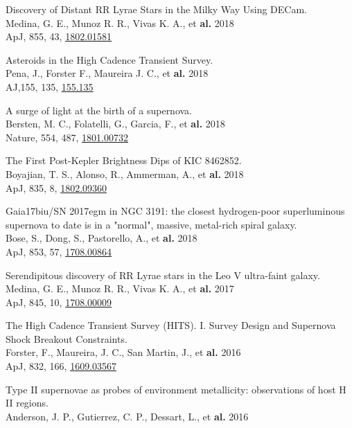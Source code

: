 \documentclass[12pt]{article}
\begin{document}
\begin{bibenum}
    \item 
Discovery of Distant RR Lyrae Stars in the Milky Way Using DECam.\\
Medina, G. E., Munoz R. R., Vivas K. A., et \textbf{al.} 2018\\
ApJ, 855, 43, \href{https://arxiv.org/abs/1802.01581}{1802.01581}
    \item 
Asteroids in the High Cadence Transient Survey.\\
Pena, J., Forster F., Maureira J. C., et \textbf{al.} 2018\\
AJ,155, 135, \href{http://adsabs.harvard.edu/abs/2018AJ....155..135P}{155.135}
    \item 	
A surge of light at the birth of a supernova.\\
Bersten, M. C., Folatelli, G., Garcia, F., et \textbf{al.} 2018\\
Nature, 554, 487, \href{https://arxiv.org/abs/1801.00732}{1801.00732}
    \item 	
The First Post-Kepler Brightness Dips of KIC 8462852.\\
Boyajian, T. S., Alonso, R., Ammerman, A., et \textbf{al.} 2018\\
ApJ, 835, 8, \href{https://arxiv.org/abs/1802.09360}{1802.09360}
    \item 	
Gaia17biu/SN 2017egm in NGC 3191: the closest hydrogen-poor superluminous supernova to date is in a "normal", massive, metal-rich spiral galaxy.\\
Bose, S., Dong, S., Pastorello, A., et \textbf{al.} 2018\\
ApJ, 853, 57, \href{https://arxiv.org/abs/1708.00864}{1708.00864}
    \item 
Serendipitous discovery of RR Lyrae stars in the Leo V ultra-faint galaxy.\\
Medina, G. E., Munoz R. R., Vivas K. A., et \textbf{al.} 2017\\
ApJ, 845, 10, \href{https://arxiv.org/abs/1708.00009}{1708.00009}
    \item 
The High Cadence Transient Survey (HITS). I. Survey Design and Supernova Shock Breakout Constraints.\\
Forster, F., Maureira, J. C., San Martin, J., et \textbf{al.} 2016\\
ApJ, 832, 166, \href{https://arxiv.org/abs/1609.03567}{1609.03567}
    \item 
Type II supernovae as probes of environment metallicity: observations of host H II regions.\\
Anderson, J. P., Gutierrez, C. P., Dessart, L., et \textbf{al.} 2016\\

\end{bibenum}
\end{document}
